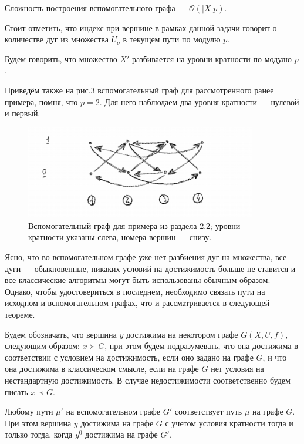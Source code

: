 	Сложность построения вспомогательного графа --- $\mathcal{O}(|X|p)$.
	
	Стоит отметить, что индекс при вершине в рамках данной задачи говорит о количестве дуг из множества $U_o$ в текущем пути по модулю $p$. 
	
	\begin{mydefinition}
		Будем говорить, что множество $X'$ разбивается на уровни кратности по модулю $p$.
	\end{mydefinition}
	
	Приведём также на рис.3 вспомогательный граф для рассмотренного ранее примера, помня, что $p = 2$. Для него наблюдаем два уровня кратности --- нулевой и первый.
	
	\begin{figure}
		\centering
		\includegraphics[width=0.9\textwidth]{img/3.png}
		\caption{Вспомогательный граф для примера из раздела 2.2; уровни кратности указаны слева, номера вершин --- снизу.}
		\label{fig:pic_3}
	\end{figure}
	
	Ясно, что во вспомогательном графе уже нет разбиения дуг на множества, все дуги --- обыкновенные, никаких условий на достижимость больше не ставится и все классические алгоритмы могут быть использованы обычным образом. Однако, чтобы удостовериться в последнем, необходимо связать пути на исходном и вспомогательном графах, что и рассматривается в следующей теореме. 
	
	\begin{mydefinition}
		Будем обозначать, что вершина $y$ достижима на некотором графе $G(X,U,f)$, следующим образом: $x \succ G$, при этом будем подразумевать, что она достижима в соответствии с условием на достижимость, если оно задано на графе $G$, и что она достижима в классическом смысле, если на графе $G$ нет условия на нестандартную достижимость.
		В случае недостижимости соответственно будем писать $x \prec G$.
	\end{mydefinition}
	
	\begin{mytheorem}
		Любому пути $\mu'$ на вспомогательном графе $G'$ соответствует путь $\mu$ на графе $G$. При этом вершина $y$ достижима на графе $G$ с учетом условия кратности тогда и только тогда, когда $y^0$ достижима на графе $G'$. 
	\end{mytheorem}
	
